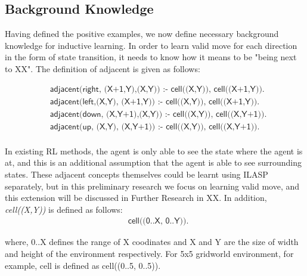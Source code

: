 \label{state_transition_example}

\subsection{Background Knowledge}
Having defined the positive examples, we now define necessary background knowledge for inductive learning.
In order to learn valid move for each direction in the form of state transition, it needs to know how it means to be "being next to XX".
The definition of \textsf{adjacent} is given as follows:

\begin{equation}
\begin{split}
&\textsf{adjacent(right, (X+1,Y),(X,Y)) :- cell((X,Y)), cell((X+1,Y)).} \\
&\textsf{adjacent(left,(X,Y),  (X+1,Y)) :- cell((X,Y)), cell((X+1,Y)).} \\
&\textsf{adjacent(down, (X,Y+1),(X,Y)) :- cell((X,Y)), cell((X,Y+1)).} \\
&\textsf{adjacent(up,   (X,Y),  (X,Y+1)) :- cell((X,Y)), cell((X,Y+1)).} \\
\end{split}
\end{equation}

In existing RL methods, the agent is only able to see the state where the agent is at, and this is an additional assumption that the agent is able to see surrounding states.
These adjacent concepts themselves could be learnt using ILASP separately, but in this preliminary research we focus on learning valid move, and this extension will be discussed in Further Research in XX.
In addition, \textit{cell((X,Y))} is defined as follows:
\begin{equation} \label{eq:cell}
\begin{split}
    &\textsf{cell((0..X, 0..Y)).}
\end{split}
\end{equation}

where, 0..X defines the range of X coodinates and X and Y are the size of width and height of the environment respectively. 
For 5x5 gridworld environment, for example, cell is defined as cell((0..5, 0..5)).


